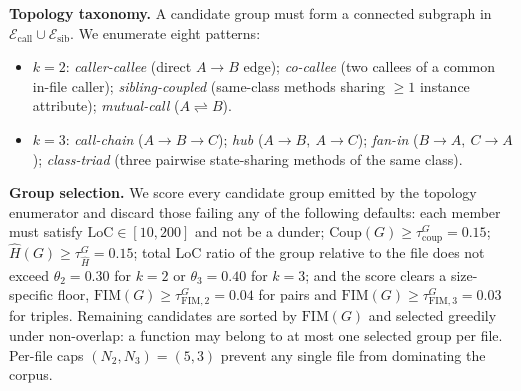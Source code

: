 \textbf{Topology taxonomy.}
A candidate group must form a connected subgraph in
$\mathcal{E}_{\mathrm{call}} \cup \mathcal{E}_{\mathrm{sib}}$. We
enumerate eight patterns:
\begin{itemize}\setlength\itemsep{0.1em}
  \item \emph{$k=2$}: \emph{caller-callee} (direct $A\!\to\!B$ edge);
  \emph{co-callee} (two callees of a common in-file caller);
  \emph{sibling-coupled} (same-class methods sharing $\geq 1$ instance
  attribute); \emph{mutual-call} ($A\!\rightleftharpoons\!B$).
  \item \emph{$k=3$}: \emph{call-chain} ($A\!\to\!B\!\to\!C$); \emph{hub}
  ($A\!\to\!B,\ A\!\to\!C$); \emph{fan-in} ($B\!\to\!A,\ C\!\to\!A$);
  \emph{class-triad} (three pairwise state-sharing methods of the same
  class).
\end{itemize}

\textbf{Group selection.}
We score every candidate group emitted by the topology enumerator and
discard those failing any of the following defaults:
each member must satisfy $\mathrm{LoC} \in [10,200]$ and not be a dunder;
$\mathrm{Coup}(G) \ge \tau^G_{\mathrm{coup}}=0.15$;
$\hat{H}(G) \ge \tau^G_{\hat H}=0.15$; total LoC ratio of the group
relative to the file does not exceed
$\theta_2=0.30$ for $k=2$ or $\theta_3=0.40$ for $k=3$; and the score
clears a size-specific floor,
$\mathrm{FIM}(G) \ge \tau^G_{\mathrm{FIM,2}}=0.04$ for pairs and
$\mathrm{FIM}(G) \ge \tau^G_{\mathrm{FIM,3}}=0.03$ for triples.
Remaining candidates are sorted by $\mathrm{FIM}(G)$ and selected
greedily under non-overlap: a function may belong to at most one selected
group per file. Per-file caps $(N_2, N_3) = (5, 3)$ prevent any single
file from dominating the corpus.

